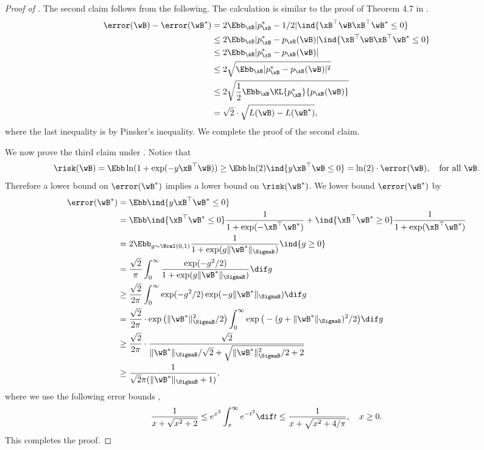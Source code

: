 \documentclass[11pt]{article}
\begin{document}
\begin{proof}[Proof of ]
The second claim follows from the following. The calculation is similar to the proof of Theorem 4.7 in \citep{mohri2018foundations}.
\begin{align*}
\error(\wB) - \error(\wB^*)    
&= 2 \Ebb_{\xB}|p^*_{\xB} - 1/2| \ind{ \xB^\top \wB \xB^\top \wB^*\le 0}\\
    &\le 2 \Ebb_{\xB}  | p^*_{\xB} - p_{\xB}(\wB) |\ind{ \xB^\top \wB \xB^\top \wB^*\le 0} \\
    &\le 2 \Ebb_{\xB}  | p^*_{\xB} - p_{\xB}(\wB) | \\
    &\le 2 \sqrt{\Ebb_{\xB}  | p^*_{\xB} - p_{\xB}(\wB) |^2 } \\
    &\le 2 \sqrt{\frac{1}{2} \Ebb_{\xB}  \KL{  p^*_{\xB}}{ p_{\xB}(\wB) } }\\
    &= \sqrt{2}\cdot \sqrt{L(\wB) - L(\wB^*)},
\end{align*}
where the last inequality is by Pinsker's inequality.
We complete the proof of the second claim.

We now prove the third claim under . 
Notice that
\begin{align*}
    \risk(\wB)
    = \Ebb \ln(1+\exp(-y\xB^\top \wB))  
    \ge \Ebb \ln(2) \ind{y \xB^\top \wB\le 0}  
    = \ln (2) \cdot \error(\wB),\quad \text{for all}\ \wB.
\end{align*}
Therefore a lower bound on $\error(\wB^*)$ implies a lower bound on $\risk(\wB^*)$.
We lower bound $\error(\wB^*)$ by
\begin{align*}
    \error(\wB^*) &= \Ebb\ind{y \xB^\top \wB^* \le 0} \\ 
    &= \Ebb \ind{\xB^\top\wB^* \le 0 } \frac{1}{1+\exp(-\xB^\top \wB^*)}+\ind{\xB^\top\wB^* \ge 0} \frac{1}{1+\exp(\xB^\top \wB^*)} \\
    &= 2 \Ebb_{g\sim \Ncal(0,1)}\frac{1}{1+\exp(g \|\wB^*\|_{\SigmaB})}\ind{g\ge 0} \\
    &= \frac{\sqrt{2}}{\pi} \int_{0}^\infty \frac{\exp(-g^2/2)}{1+\exp(g\|\wB^*\|_{\SigmaB})}\dif g \\
    &\ge \frac{\sqrt{2}}{2\pi} \int_{0}^\infty \exp(-g^2/2)\exp(-g\|\wB^*\|_{\SigmaB})\dif g \\
    &= \frac{\sqrt{2}}{2\pi} \cdot \exp\big(\|\wB^*\|_{\SigmaB}^2/2\big) \int_{0}^\infty\exp\big(-(g+\|\wB^*\|_{\SigmaB})^2/2\big)\dif g \\
    &\ge \frac{\sqrt{2}}{2\pi}\cdot  \frac{\sqrt{2}}{\|\wB^*\|_{\SigmaB}/\sqrt{2} + \sqrt{\|\wB^*\|^2_{\SigmaB}/2+2}} \\
&\ge \frac{1}{\sqrt{2}\pi(\|\wB^*\|_{\SigmaB} + 1)},
\end{align*}
where we use the following error bounds \citep{abramowitz1965handbook},
\begin{align*}
    \frac{1}{x+\sqrt{x^2+2}}\le e^{x^2}\int_{x}^{\infty}e^{-t^2}\dif t \le \frac{1}{x+\sqrt{x^2+4/\pi}},\quad x\ge 0.
\end{align*}
This completes the proof.
\end{proof}
\end{document}
